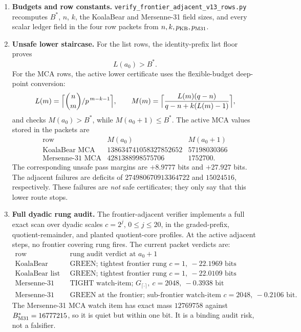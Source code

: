 \begin{enumerate}[label=\textup{(\arabic*)}]
\item \textbf{Budgets and row constants.}
\texttt{verify\_frontier\_adjacent\_v13\_rows.py} recomputes \(B^*\), \(n\),
\(k\), the KoalaBear and Mersenne-31 field sizes, and every scalar ledger
field in the four row packets from \(n,k,p_{\rm KB},p_{\rm M31}\).

\item \textbf{Unsafe lower staircase.}
For the list rows, the identity-prefix list floor proves
\[
        L(a_0)>B^*.
\]
For the MCA rows, the active lower certificate uses the flexible-budget
deep-point conversion:
\[
        L(m)=\Bigl\lceil\binom{n}{m}/p^{\,m-k-1}\Bigr\rceil,\qquad
        M(m)=\Bigl\lceil
        \frac{L(m)(q-n)}{q-n+k(L(m)-1)}
        \Bigr\rceil,
\]
and checks \(M(a_0)>B^*\), while \(M(a_0+1)\le B^*\).  The active MCA values
stored in the packets are
\[
\begin{array}{c|cc}
\text{row} & M(a_0) & M(a_0+1)\\ \hline
\text{KoalaBear MCA} & 138634741058327852652 & 57198030366\\
\text{Mersenne-31 MCA} & 4281388998575706 & 1752700.
\end{array}
\]
The corresponding unsafe pass margins are \(+8.9777\) bits and \(+27.927\)
bits.  The adjacent failures are deficits of
\(274980670913364722\) and \(15024516\), respectively.  These failures are
\emph{not} safe certificates; they only say that this lower route stops.

\item \textbf{Full dyadic rung audit.}
The frontier-adjacent verifier implements a full exact scan over dyadic scales
\(c=2^j\), \(0\le j\le20\), in the graded-prefix, quotient-remainder, and
planted quotient-core profiles.  At the active adjacent steps, no frontier
covering rung fires.  The current packet verdicts are:
\[
\begin{array}{c|l}
\text{row} & \text{rung audit verdict at }a_0+1\\ \hline
\text{KoalaBear MCA} & \text{GREEN; tightest frontier rung }c=1,\ -22.1969
\text{ bits}\\
\text{KoalaBear list} & \text{GREEN; tightest frontier rung }c=1,\ -22.0109
\text{ bits}\\
\text{Mersenne-31 MCA} &
\text{TIGHT watch-item; }G_{\lceil\cdot\rceil},\ c=2048,\ -0.3938\text{ bit}\\
\text{Mersenne-31 list} & \text{GREEN at the frontier; sub-frontier watch-item }
c=2048,\ -0.2106\text{ bit}.
\end{array}
\]
The Mersenne-31 MCA watch item has exact mass \(12769758\) against
\(B^*_{\rm M31}=16777215\), so it is quiet but within one bit.  It is a
binding audit risk, not a falsifier.


\end{enumerate}
